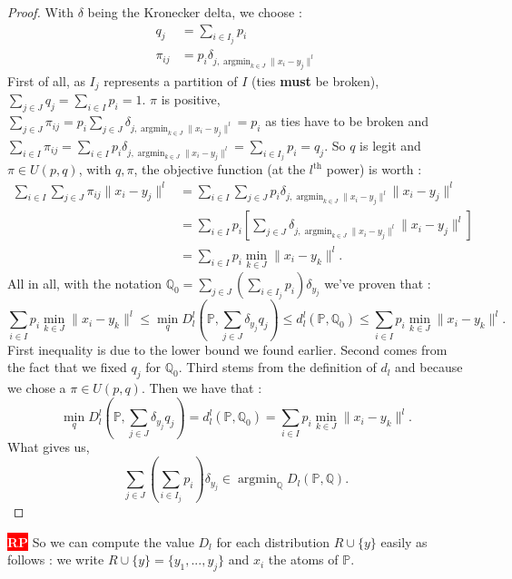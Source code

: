 \documentclass{amsart}
\newcommand{\argmin}{\mathop{\arg\min}}
\newcommand{\nb}[3]{
		{\colorbox{#2}{\bfseries\sffamily\tiny\textcolor{white}{#1}}}
		{\textcolor{#2}{\text{$\blacktriangleright$}{\textcolor{#2}{#3}}\text{$\blacktriangleleft$}}}}
\newcommand{\rp}[1]{\nb{RP}{red}{#1}}
\begin{document}
\begin{proof}
With $\delta$ being the Kronecker delta, we choose : \begin{align*}
    q_j&=\sum_{i\in I_j}p_i \\
    \pi_{ij}&=p_i\delta_{j,\argmin_{k\in J}\lVert x_i-y_j\rVert^l}
\end{align*}
First of all, as $I_j$ represents a partition of $I$ (ties \textbf{must} be broken), $\sum_{j\in J}q_j=\sum_{i\in I}p_i=1$.\newline
$\pi$ is positive, $\sum_{j\in J}\pi_{ij}=p_i\sum_{j\in J}\delta_{j,\argmin_{k\in J}\lVert x_i-y_j\rVert^l}=p_i$ as ties have to be broken and \newline $\sum_{i\in I}\pi_{ij}=\sum_{i\in I}p_i\delta_{j,\argmin_{k\in J}\lVert x_i-y_j\rVert^l}=\sum_{i\in I_j}p_i=q_j$. So $q$ is legit and $\pi\in U\left(p,q\right)$, with $q,\pi$, the objective function (at the $l^{\text{th}}$ power) is worth : 
\begin{align*}
    \sum_{i\in I}\sum_{j\in J}\pi_{ij}\lVert x_i-y_j\rVert^l &=\sum_{i\in I}\sum_{j\in J}p_i\delta_{j, \argmin_{k\in J}\lVert x_i-y_j\rVert^l}\lVert x_i-y_j\rVert^l \\ &=\sum_{i\in I}p_i\left[\sum_{j\in J}\delta_{j, \argmin_{k\in J}\lVert x_i-y_j\rVert^l}\lVert x_i-y_j\rVert^l\right] \\ &=\sum_{i\in I}p_i\min_{k\in J}\lVert x_i-y_k\rVert ^l.
\end{align*}
All in all, with the notation $\mathbb{Q}_0=\sum_{j\in J}\left(\sum_{i\in I_j}p_i\right)\delta_{y_j}$ we've proven that :
$$
\sum_{i\in I}p_i\min_{k\in J}\lVert x_i-y_k\rVert ^l\leq \min_{q} D_l^l\left(\mathbb{P},\sum_{j\in J}\delta_{y_j}q_j\right)\leq d_l^l\left(\mathbb{P},\mathbb{Q}_0\right) \leq \sum_{i\in I}p_i\min_{k\in J}\lVert x_i-y_k\rVert ^l.
$$
First inequality is due to the lower bound we found earlier. Second comes from the fact that we fixed $q_j$ for $\mathbb{Q}_0$. Third stems from the definition of $d_l$ and because we chose a $\pi\in U\left(p,q\right)$. Then we have that :
$$
\min_{q} D_l^l\left(\mathbb{P},\sum_{j\in J}\delta_{y_j}q_j\right)= d_l^l\left(\mathbb{P},\mathbb{Q}_0\right)= \sum_{i\in I}p_i\min_{k\in J}\lVert x_i-y_k\rVert ^l.
$$
What gives us,
$$\sum_{j\in J}\left(\sum_{i\in I_j}p_i\right)\delta_{y_j}\in \argmin_\mathbb{Q} D_l\left(\mathbb{P},\mathbb{Q}\right).$$
\end{proof}
\rp{what do you think of this proof ? i gave it all}
So we can compute the value $D_l$ for each distribution $R\cup\{y\}$ easily as follows : we write $R\cup \{y\}=\{y_1,...,y_j\}$ and $x_i$ the atoms of $\mathbb{P}$.
\end{document}
